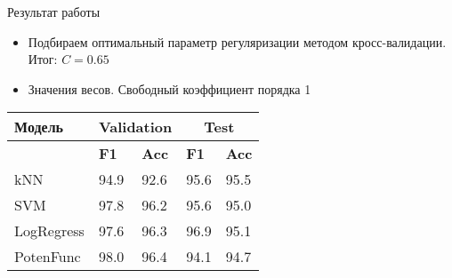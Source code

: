 \documentclass[unicode]{beamer}
\begin{document}
\begin{frame}{Результат работы}
    \begin{itemize}
        \item Подбираем оптимальный параметр регуляризации методом кросс-валидации. Итог: $C =  0.65$
        \item Значения весов. Свободный коэффициент порядка 1
    \end{itemize}

\vspace{3pt}\hspace{13pt}
\begin{centering}
    \begin{small}
        \begin{tabular}{|p{50pt}||p{35pt}|p{35pt}||p{35pt}|p{35pt}|}
            \hline
            \textbf{Модель} & \multicolumn{2}{|c||}{\textbf{Validation}} & \multicolumn{2}{|c|}{\textbf{Test}} \\
            \hline
            & \textbf{F1} & \textbf{Acc} & \textbf{F1} & \textbf{Acc}  \\
            \hline
            kNN & 94.9 & 92.6 & 95.6 & 95.5 \\
            \hline
            SVM & 97.8 & 96.2 & 95.6 & 95.0 \\
            \hline
            LogRegress & 97.6 & 96.3 & 96.9 & 95.1 \\
            \hline
            PotenFunc & 98.0 & 96.4 & 94.1 & 94.7 \\
            \hline
        \end{tabular}
    \end{small}
\end{centering}
\vspace{5pt}


\end{frame}
\end{document}
